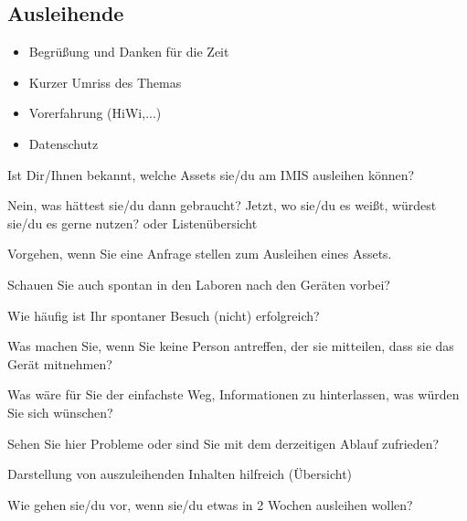 \subsection{Ausleihende}
\begin{itemize}
    \item Begrüßung und Danken für die Zeit
    \item Kurzer Umriss des Themas
    \item Vorerfahrung (HiWi,...)
    \item Datenschutz
\end{itemize}

{\sffamily\color{maincolor}{Abschnitt: Jetzt}}
\begin{compactenum}
    \item Ist Dir/Ihnen bekannt, welche Assets sie/du am IMIS ausleihen können?
          \begin{compactenum}
              \item Nein, was hättest sie/du dann gebraucht? Jetzt, wo sie/du  es weißt, würdest sie/du  es gerne
                    nutzen? oder Listenübersicht
              \item Vorgehen, wenn Sie eine Anfrage stellen zum Ausleihen eines Assets.
                    \begin{compactenum}
                        \item Schauen Sie auch spontan in den Laboren nach den Geräten vorbei?
                        \item Wie häufig ist Ihr spontaner Besuch (nicht) erfolgreich?
                        \item Was machen Sie, wenn Sie keine Person antreffen, der sie mitteilen, dass sie das Gerät mitnehmen?
                        \item Was wäre für Sie der einfachste Weg, Informationen zu hinterlassen, was würden Sie sich wünschen?
                    \end{compactenum}
              \item Sehen Sie hier Probleme oder sind Sie mit dem derzeitigen Ablauf zufrieden?
                    \begin{compactenum}
                        \item Darstellung von auszuleihenden Inhalten hilfreich (Übersicht)
                        \item Wie gehen sie/du  vor, wenn sie/du etwas in 2 Wochen ausleihen wollen?
                    \end{compactenum}
          \end{compactenum}
\end{compactenum}

